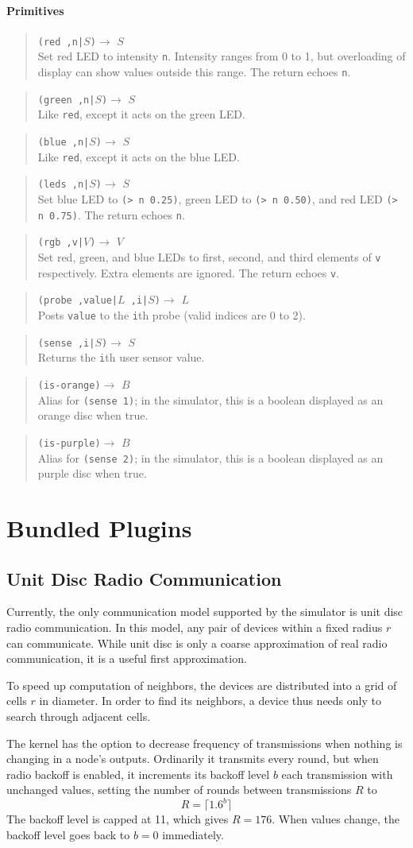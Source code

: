 \documentclass{article}
\newcommand\var[1]{{\tt #1}}
\newcommand\function[3]
{\begin{quote}{\tt #1}$\rightarrow$ \type{#2} \\ #3 \end{quote}}
\newcommand\type[1]{$#1$}
\begin{document}
\paragraph{Primitives}
\function{(red ,n|\type{S})}{S}{Set red LED to intensity \var{n}.  Intensity
  ranges from 0 to 1, but overloading of display can show values outside
  this range.  The return echoes \var{n}.}
\function{(green ,n|\type{S})}{S}{Like \var{red}, except it acts on
  the green LED.}
\function{(blue ,n|\type{S})}{S}{Like \var{red}, except it acts on
  the blue LED.}
\function{(leds ,n|\type{S})}{S}{Set blue LED to \var{(> n 0.25)}, green
  LED to \var{(> n 0.50)}, and red LED \var{(> n 0.75)}.  The return
  echoes \var{n}.}
\function{(rgb ,v|\type{V})}{V}{Set red, green, and blue LEDs to first,
  second, and third elements of \var{v} respectively.  Extra elements
  are ignored.  The return echoes \var{v}.}

\function{(probe ,value|\type{L} ,i|\type{S})}{L}{Posts \var{value} to
  the \var{i}th probe (valid indices are 0 to 2).}

\function{(sense ,i|\type{S})}{S}{Returns the \var{i}th user sensor
  value.}
\function{(is-orange)}{B}{Alias for \var{(sense 1)}; in the simulator,
  this is a boolean displayed as an orange disc when true.}
\function{(is-purple)}{B}{Alias for \var{(sense 2)}; in the simulator,
  this is a boolean displayed as an purple disc when true.}


\section{Bundled Plugins}

\subsection{Unit Disc Radio Communication}

Currently, the only communication model supported by the simulator
is unit disc radio communication.  In this model, any pair of devices
within a fixed radius $r$ can communicate.  While unit disc is only a coarse
approximation of real radio communication, it is a useful first 
approximation.  

To speed up computation of neighbors, the devices are distributed into
a grid of cells $r$ in diameter.  In order to find its neighbors, a
device thus needs only to search through adjacent cells.

The kernel has the option to decrease frequency of transmissions when
nothing is changing in a node's outputs.  Ordinarily it transmits
every round, but when radio backoff is enabled, it increments its
backoff level $b$ each transmission with unchanged values, setting the
number of rounds between transmissions $R$ to
$$R = \lceil{1.6^{b}}\rceil$$
The backoff level is capped at 11, which gives $R=176$.  When values
change, the backoff level goes back to $b=0$ immediately.
\end{document}
